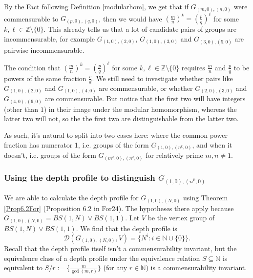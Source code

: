 \documentclass[10pt]{article}
\def\integers{{\mathbb{Z}}}
\def\naturals{{\mathbb N}}
\def\D{\mathcal{D}}
\def\subs{\subseteq}
\theoremstyle{definition}
\begin{document}
By the Fact following Definition \ref{modularhom}, we get that if $G_{(m,0),(n,0)}$ were commensurable to $G_{(p,0),(q,0)}$, then we would have $\left(\frac{m}{n}\right)^k = \left(\frac{p}{q}\right)^\ell$ for some $k,\ell \in \integers\setminus \{0\}$. This already tells us that a lot of candidate pairs of groups are incommensurable, for example $G_{(1,0),(2,0)}$, $G_{(1,0),(3,0)}$ and $G_{(3,0),(5,0)}$ are pairwise incommensurable. 

The condition that $\left(\frac{m}{n}\right)^k = \left(\frac{p}{q}\right)^\ell$ for some $k,\ell \in \integers\setminus \{0\}$ requires  $\frac{m}{n}$ and $\frac{p}{q}$ to be powers of the same fraction $\frac{c}{d}$. We still need to investigate whether pairs like $G_{(1,0),(2,0)}$ and $G_{(1,0),(4,0)}$ are commensurable, or whether $G_{(2,0),(3,0)}$ and $G_{(4,0),(9,0)}$ are commensurable. But notice that the first two will have integers (other than $1$) in their image under the modular homomorphism, whereas the latter two will not, so the the first two are distinguishable from the latter two. 

As such, it's natural to split into two cases here: where the common power fraction has numerator 1, i.e.  groups of the form $G_{(1,0),(n^k,0)}$, and when it doesn't, i.e. groups of the form $G_{(m^k,0),(n^k,0)}$ for relatively prime $m,n\ne 1$. 

\subsubsection{Using the depth profile to distinguish \texorpdfstring{$G_{(1,0),(n^k,0)}$}{G}}

We are able to calculate the depth profile for $G_{(1,0),(N,0)}$ using Theorem \ref{Prop6.2For} (Proposition 6.2 in For24). The hypotheses there apply because $G_{(1,0),(N,0)} = BS(1,N) \vee BS(1,1)$. Let $V$ be the vertex group of $BS(1,N) \vee BS(1,1)$. We find that the depth profile is
$$\D(G_{(1,0),(N,0)},V) = \{N^i: i\in \naturals \cup \{0\}\}.$$
Recall that the depth profile itself isn't a commensurability invariant, but the equivalence class of a depth profile under the equivalence relation $S\subs \naturals$ is equivalent to $S/r := \{\frac{m}{\gcd(m,r)}\}$ (for any $r\in\naturals$) is a commensurability invariant. 
\end{document}
